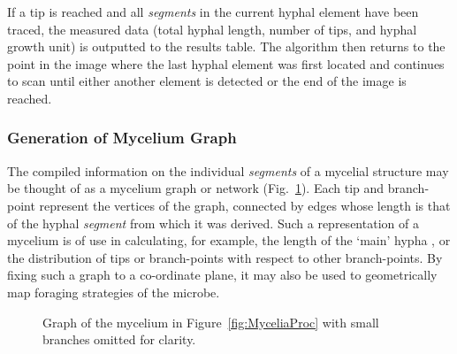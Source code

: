 If a tip is reached and all \emph{segments} in the current hyphal element have been traced, the measured data (total hyphal length, number of tips, and hyphal growth unit) is outputted to the results table. The algorithm then returns to the point in the image where the last hyphal element was first located and continues to scan until either another element is detected or the end of the image is reached.

\subsubsection{Generation of Mycelium Graph}

The compiled information on the individual \emph{segments} of a mycelial structure may be thought of as a mycelium graph or network (Fig.~\ref{fig:MyceliumGraph}). Each tip and branch-point represent the vertices of the graph, connected by edges whose length is that of the hyphal \emph{segment} from which it was derived.  Such a representation of a mycelium is of use in calculating, for example, the length of the \lq main' hypha \cite{papagianni2006a}, or the distribution of tips or branch-points with respect to other branch-points. By fixing such a graph to a co-ordinate plane, it may also be used to geometrically map foraging strategies of the microbe.

\begin{figure}[t]
	\centering
  \caption{Graph of the mycelium in Figure~\ref{fig:MyceliaProc} with small branches omitted for clarity.}
  \label{fig:MyceliumGraph}
\end{figure}

